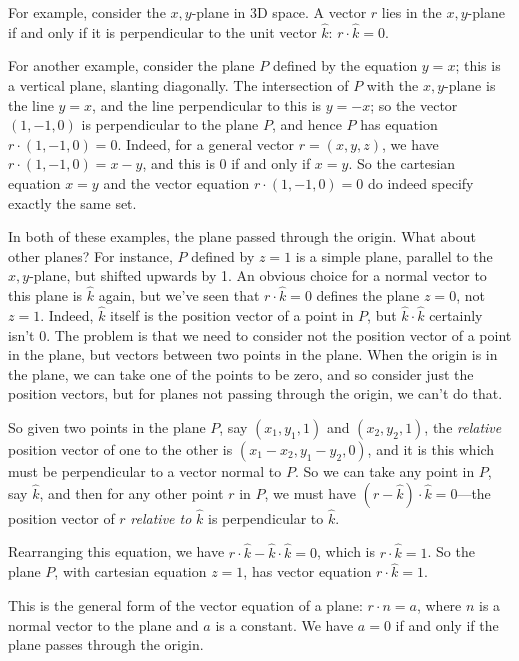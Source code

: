 \documentclass{article}
\newcommand{\khat}{\hat{k}}
\begin{document}
For example, consider the $x,y$-plane in 3D space. A vector $r$ lies in the $x,y$-plane if and only if it is perpendicular to the unit vector $\khat$: $r\cdot \khat=0$.

For another example, consider the plane $P$ defined by the equation $y=x$; this is a vertical plane, slanting diagonally. The intersection of $P$ with the $x,y$-plane is the line $y=x$, and the line perpendicular to this is $y=-x$; so the vector $(1,-1,0)$ is perpendicular to the plane $P$, and hence $P$ has equation $r\cdot(1,-1,0)=0$. Indeed, for a general vector $r=(x,y,z)$, we have $r\cdot (1,-1,0)=x-y$, and this is 0 if and only if $x=y$. So the cartesian equation $x=y$ and the vector equation $r\cdot(1,-1,0)=0$ do indeed specify exactly the same set.

In both of these examples, the plane passed through the origin. What about other planes? For instance, $P$ defined by $z=1$ is a simple plane, parallel to the $x,y$-plane, but shifted upwards by 1. An obvious choice for a normal vector to this plane is $\khat$ again, but we've seen that $r\cdot\khat=0$ defines the plane $z=0$, not $z=1$. Indeed, $\khat$ itself is the position vector of a point in $P$, but $\khat\cdot\khat$ certainly isn't 0. The problem is that we need to consider not the position vector of a point in the plane, but vectors between two points in the plane. When the origin is in the plane, we can take one of the points to be zero, and so consider just the position vectors, but for planes not passing through the origin, we can't do that.

So given two points in the plane $P$, say $(x_1,y_1,1)$ and $(x_2,y_2,1)$, the \textit{relative} position vector of one to the other is $(x_1-x_2,y_1-y_2,0)$, and it is this which must be perpendicular to a vector normal to $P$. So we can take any point in $P$, say $\khat$, and then for any other point $r$ in $P$, we must have $(r-\khat)\cdot\khat=0$---the position vector of $r$ \textit{relative to} $\khat$ is perpendicular to $\khat$.

Rearranging this equation, we have $r\cdot\khat-\khat\cdot\khat=0$, which is $r\cdot\khat=1$. So the plane $P$, with cartesian equation $z=1$, has vector equation $r\cdot\khat=1$.

This is the general form of the vector equation of a plane: $r\cdot n=a$, where $n$ is a normal vector to the plane and $a$ is a constant. We have $a=0$ if and only if the plane passes through the origin.


\clearpage
\end{document}
